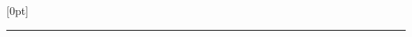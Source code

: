 
\renewcommand{\sectionmark}[1]{ }
\renewcommand{\subsectionmark}[1]{ }

\def\HDRULE{\rule[-.6\baselineskip]{\textwidth}{1pt}}
\newsavebox{\HDRULEBOX}
\savebox{\HDRULEBOX}[0pt]{\HDRULE}







\makeatletter
%
%
%
\def\wordn{\verb|:word|$n$}
\def\word{\@ifnextchar[{\@word}{\@word[*]}}
\def\@word[#1]{\verb|:(#1)word|}
\def\sect{\@startsection {subsection}{1}{\z@}{-3.5ex plus -1ex minus
 -.2ex}{1.5ex plus .2ex}{\normalsize\bf}}
\def\subsect{\@startsection {subsubsection}{2}{\z@}{-3.5ex plus -1ex minus
 -.2ex}{-1em}{\footnotesize\bf}}
\def\inputmlfile#1{\begingroup \footnotesize #1 \endgroup}

%
%
%
%
%
\makeatother


